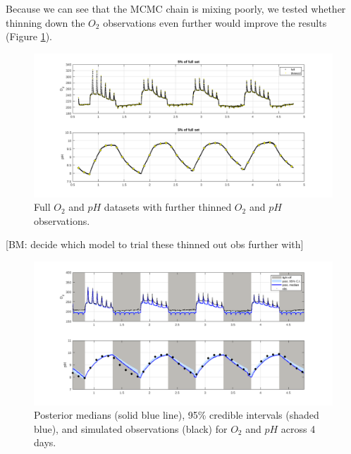 \documentclass{ruthesis}
\begin{document}
Because we can see that the MCMC chain is mixing poorly, we tested whether thinning down the $O_2$ observations even further would improve the results (Figure \ref{fig:thinned_obs_further_micro}).

\begin{figure}
	\centerline{\includegraphics[width=1.25\textwidth]{images_microalgae/plots/thinned_obs_micro_further}}
	\caption[.]{Full $O_2$ and $pH$ datasets with further thinned $O_2$ and $pH$ observations.}
	\label{fig:thinned_obs_further_micro}
\end{figure}


[BM: decide which model to trial these thinned out obs further with]

\begin{figure}
	\centerline{\includegraphics[width=1.2\textwidth]{images_microalgae/plots_test/O2_pH}}
	\caption[.]{Posterior medians (solid blue line), 95\% credible intervals (shaded blue), and simulated observations (black) for $O_2$ and $pH$ across 4 days.}
	\label{fig:micro_exp_test_O2_pH}
\end{figure}
\end{document}
